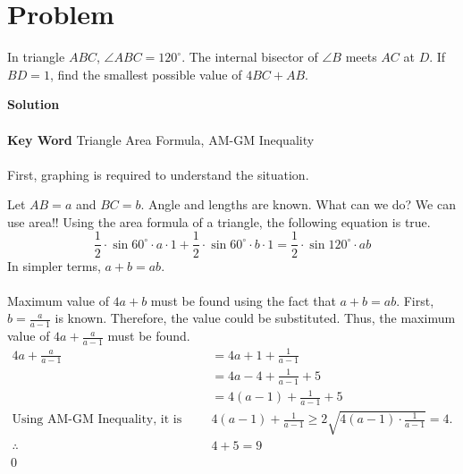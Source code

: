 \documentclass{article}
\newenvironment{solution}{\begin{trivlist}\item[]{\bf Solution}}{\qed \end{trivlist}}
\begin{document}
\section*{Problem}
In triangle $ABC$, $\angle{ABC}=120^{\circ}$. The internal bisector of $\angle{B}$ meets $AC$ at $D$. If $BD=1$, find the smallest possible value of $4BC+AB$.
\begin{solution}
\\\\
\textbf{Key Word} Triangle Area Formula, AM-GM Inequality
\\\\
First, graphing is required to understand the situation.
\begin{center}
\end{center}
Let $AB=a$ and $BC=b$. Angle and lengths are known. What can we do? We can use area!! Using the area formula of a triangle, the following equation is true.
\[
\frac{1}{2}\cdot\sin60^{\circ}\cdot{a}\cdot1+\frac{1}{2}\cdot\sin60^{\circ}\cdot{b}\cdot1=\frac{1}{2}\cdot\sin120^{\circ}\cdot{ab}
\]
In simpler terms, $a+b=ab$.
\\\\
Maximum value of $4a+b$ must be found using the fact that $a+b=ab$. First, $b=\frac{a}{a-1}$ is known. Therefore, the value could be substituted. Thus, the maximum value of $4a+\frac{a}{a-1}$ must be found.
\begin{align*}
4a+\frac{a}{a-1}
&=4a+1+\frac{1}{a-1} \\
&=4a-4+\frac{1}{a-1}+5 \\
&=4(a-1)+\frac{1}{a-1}+5 \\
\text{Using AM-GM Inequality, it is known that }& 4(a-1)+\frac{1}{a-1}\ge2\sqrt{4(a-1)\cdot\frac{1}{a-1}}=4. \\
\therefore\ &4+5=\boxed{9}
\end{align*}
\end{solution}
\end{document}
